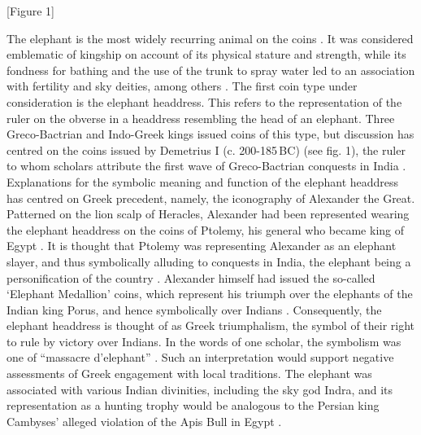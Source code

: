 \documentclass{ijsra}
\renewcommand\BC{{\,BC\xspace}}
\begin{document}
[Figure 1]

The elephant is the most widely recurring animal on the coins \parencite[383--384]{Bopearachchi1991}.
It was considered emblematic of kingship on account of its physical stature and strength,
while its fondness for bathing and the use of the trunk to spray water led to an association with fertility and sky deities,
among others \parencites[15--19]{Gupta1983}[156]{Iossif2010}.
The first coin type under consideration is the elephant headdress.
This refers to the representation of the ruler on the obverse in a headdress resembling the head of an elephant.
Three Greco-Bactrian and Indo-Greek kings issued coins of this type, but discussion has centred on the coins issued by Demetrius I
(c. 200-185\BC) (see fig. 1), the ruler to whom scholars attribute the first wave of Greco-Bactrian conquests in India
\parencites[47--48]{Bopearachchi2011}[17--18]{Kalita1997}.
Explanations for the symbolic meaning and function of the elephant headdress has centred on Greek precedent,
namely, the iconography of Alexander the Great.
Patterned on the lion scalp of Heracles, Alexander had been represented wearing the elephant headdress on the coins of Ptolemy,
his general who became king of Egypt \parencite[21--31]{Lorber2012}.
It is thought that Ptolemy was representing Alexander as an elephant slayer, and thus symbolically alluding to conquests in India,
the elephant being a personification of the country \parencites[50]{Curtis2007}[335]{Green1993}[104--105]{MacDowall2007a}.
Alexander himself had issued the so-called ‘Elephant Medallion’ coins, which represent his triumph over the elephants of the Indian
king Porus, and hence symbolically over Indians \parencite[151--152]{Holt2003}.
Consequently, the elephant headdress is thought of as Greek triumphalism, the symbol of their right to rule by victory over Indians.
In the words of one scholar, the symbolism was one of “massacre d’elephant” \parencite[232, 492]{Widemann2009}.
Such an interpretation would support negative assessments of Greek engagement with local traditions.
The elephant was associated with various Indian divinities, including the sky god Indra, and its representation as a hunting trophy
would be analogous to the Persian king Cambyses’ alleged violation of the Apis Bull in Egypt \parencite[15--19]{Gupta1983}.
\end{document}
